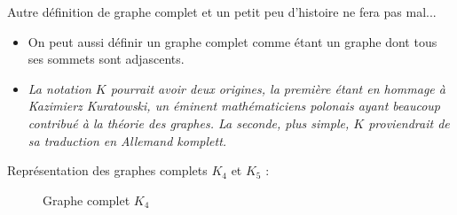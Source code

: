 \begin{remark}
    Autre définition de graphe complet et un petit peu d'histoire ne fera pas mal...
    \begin{itemize}
        \item On peut aussi définir un graphe complet comme étant un graphe dont tous ses sommets sont adjascents.
        \item  \emph{La notation $K$ pourrait avoir deux origines, la première étant en hommage à Kazimierz Kuratowski, 
        un éminent mathématiciens polonais ayant beaucoup contribué à la théorie des graphes. La seconde, plus simple, $K$
        proviendrait de sa traduction en Allemand komplett.}
    \end{itemize}
\end{remark}

\begin{example}
    Représentation des graphes complets $K_4$ et $K_5$ :
    \begin{figure}[h]
        \centering
        \begin{minipage}{0.45\textwidth}  %
            \centering
              \caption{Graphe complet \( K_4 \)}
              \label{fig:K4-entiers}
        \end{minipage}
        \hfill %
        \begin{minipage} {0.45\textwidth}  %
            \centering
\end{minipage}
\end{figure}
\end{example}
